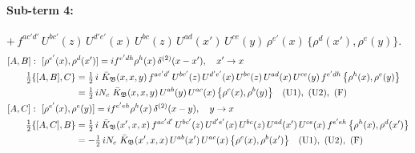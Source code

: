 \documentclass[10pt]{article}
\numberwithin{equation}{section}
\begin{document}
\paragraph{Sub-term 4:} $+\,f^{ac'd'}\,U^{bc'}(z)\,U^{d'e'}(x)\,U^{bc}(z)\,U^{ad}(x')\,U^{ce}(y)\,\rho^{e'}(x)\,\big\{\rho^{d}(x'),\rho^{e}(y)\big\}$.
\begin{align}
&[A,B]:\ [\rho^{e'}(x),\rho^{d}(x')]=i f^{e'dh}\rho^{h}(x)\,\delta^{(2)}(x-x'),\quad x'\to x\notag\\
&\qquad \tfrac12\{[A,B],C\}=\tfrac12\,i\,\,\bar K_{\mathfrak B}(x,x,y)\,f^{ac'd'}\,U^{bc'}(z)\,U^{d'e'}(x)\,U^{bc}(z)\,U^{ad}(x)\,U^{ce}(y)\,f^{e'dh}\,\big\{\rho^{h}(x),\rho^{e}(y)\big\}\notag\\
&\qquad\phantom{\tfrac12\{[A,B],C\}}=\tfrac12\,i N_{c}\,\,\bar K_{\mathfrak B}(x,x,y)\,U^{ab}(y)\,U^{ac}(x)\,\big\{\rho^{c}(x),\rho^{b}(y)\big\}\quad\text{(U1)},\ \text{(U2)},\ \text{(F)}
\label{R:eq:GII.I2-4-AB}\\
&[A,C]:\ [\rho^{e'}(x),\rho^{e}(y)]=i f^{e'eh}\rho^{h}(x)\,\delta^{(2)}(x-y),\quad y\to x\notag\\
&\qquad \tfrac12\{[A,C],B\}=\tfrac12\,i\,\,\bar K_{\mathfrak B}(x',x,x)\,f^{ac'd'}\,U^{bc'}(z)\,U^{d'e'}(x)\,U^{bc}(z)\,U^{ad}(x')\,U^{ce}(x)\,f^{e'eh}\,\big\{\rho^{h}(x),\rho^{d}(x')\big\}\notag\\
&\qquad\phantom{\tfrac12\{[A,C],B\}}=-\tfrac12\,i N_{c}\,\,\bar K_{\mathfrak B}(x',x,x)\,U^{ab}(x')\,U^{ac}(x)\,\big\{\rho^{c}(x),\rho^{b}(x')\big\}\quad\text{(U1)},\ \text{(U2)},\ \text{(F)}
\label{R:eq:GII.I2-4-AC}
\end{align}
\end{document}

